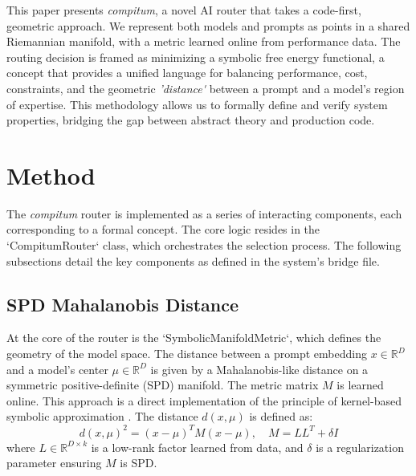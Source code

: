 \documentclass[11pt]{article}
\begin{document}
This paper presents \textit{compitum}, a novel AI router that takes a code-first, geometric approach. We represent both models and prompts as points in a shared Riemannian manifold, with a metric learned online from performance data. The routing decision is framed as minimizing a symbolic free energy functional, a concept that provides a unified language for balancing performance, cost, constraints, and the geometric \textit{'distance\'} between a prompt and a model's region of expertise. This methodology allows us to formally define and verify system properties, bridging the gap between abstract theory and production code.

\section{Method}
\label{sec:method}
The \textit{compitum} router is implemented as a series of interacting components, each corresponding to a formal concept. The core logic resides in the `CompitumRouter` class, which orchestrates the selection process. The following subsections detail the key components as defined in the system's bridge file.

\subsection{SPD Mahalanobis Distance}
\label{eq:bk2_metric_spd_mahalanobis}
At the core of the router is the `SymbolicManifoldMetric`, which defines the geometry of the model space. The distance between a prompt embedding $x \in \mathbb{R}^D$ and a model's center $\mu \in \mathbb{R}^D$ is given by a Mahalanobis-like distance on a symmetric positive-definite (SPD) manifold. The metric matrix $M$ is learned online. This approach is a direct implementation of the principle of kernel-based symbolic approximation \cite{principia_symbolica}. The distance $d(x, \mu)$ is defined as:
\begin{equation}
d(x, \mu)^2 = (x - \mu)^T M (x - \mu), \quad M = LL^T + \delta I
\end{equation}
where $L \in \mathbb{R}^{D \times k}$ is a low-rank factor learned from data, and $\delta$ is a regularization parameter ensuring $M$ is SPD.
\end{document}
